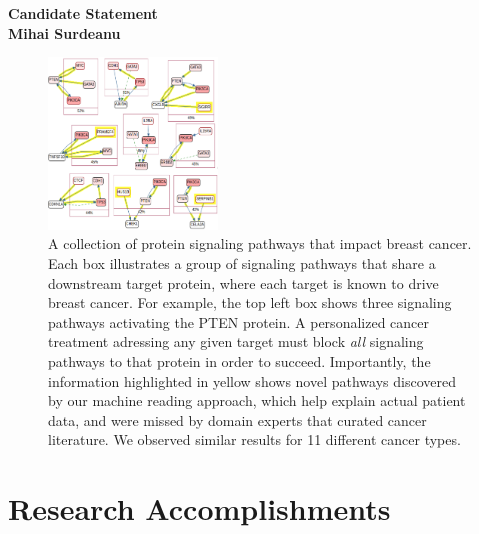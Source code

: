 \documentclass[10pt]{article}
\begin{document}

\begin{center}
{\Large \bf Candidate Statement\\
\smallskip
{\large \bf Mihai Surdeanu}}
\end{center}

\begin{figure}
  \begin{center}
    \vspace{-10mm}
    \includegraphics[width=0.40\textwidth]{mutex_simplified}
  \end{center}
  \vspace{-4mm}
  \caption{{\small A collection of protein signaling pathways that impact breast cancer. Each box illustrates a group of signaling pathways that share a downstream target protein, where each target is known to drive breast cancer. For example, the top left box shows three signaling pathways activating the PTEN protein. 
  A personalized cancer treatment adressing any  given target must block \emph{all} signaling pathways to that protein in order to succeed.
  Importantly, the information highlighted in \colorbox{yellow!30}{yellow} shows novel pathways discovered by our machine reading approach, which help explain actual patient data, and were missed by domain experts that curated cancer literature. We observed similar results for 11 different cancer types.}}
  \label{fig:mutex}
  \vspace{-10mm}
\end{figure}


\section{Research Accomplishments}
\end{document}
